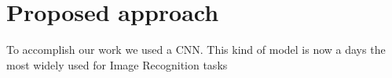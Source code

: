 \section{Proposed approach}
%

To accomplish our work we used a CNN. This kind of model is now a days the most widely used for Image Recognition tasks 

